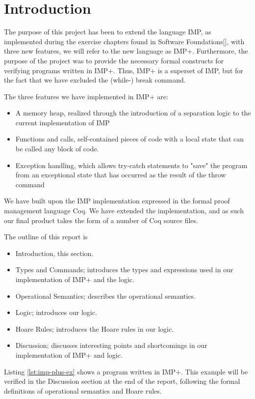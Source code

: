 
\section{Introduction}
The purpose of this project has been to extend the language IMP, as implemented during the exercise chapters found in Software Foundations[\cite{soft}], with three new features, we will refer to the new language as IMP+. Furthermore, the purpose of the project was to provide the necessary formal constructs for verifying programs written in IMP+. Thus, IMP+ is a superset of IMP, but for the fact that we have excluded the (while-) break command.

The three features we have implemented in IMP+ are:
\begin{itemize}
\item A memory heap, realized through the introduction of a separation logic to the current implementation of IMP
\item Functions and calls, self-contained pieces of code with a local state that can be called any block of code.
\item Exception handling, which allows try-catch statements to "save" the program from an exceptional state that has occurred as the result of the throw command
\end{itemize}

We have built upon the IMP implementation expressed in the formal proof management language Coq. We have extended the implementation, and as such our final product takes the form of a number of Coq source files.

The outline of this report is
\begin{itemize}
\item Introduction, this section.
\item Types and Commands; introduces the types and expressions used in our implementation of IMP+ and the logic.
\item Operational Semantics; describes the operational semantics.
\item Logic; introduces our logic.
\item Hoare Rules; introduces the Hoare rules in our logic.
\item Discussion; discusses interesting points and shortcomings in our implementation of IMP+ and logic.
\end{itemize}

Listing \ref{lst:imp-plus-ex} shows a program written in IMP+. This example will be verified in the Discussion section at the end of the report, following the formal definitions of operational semantics and Hoare rules.

